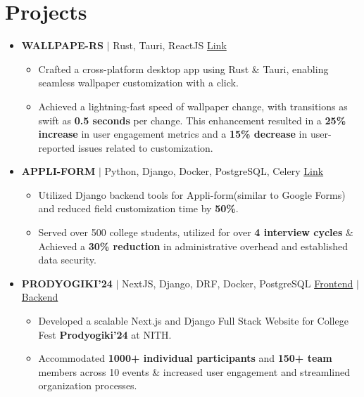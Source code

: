 \documentclass[legalpaper,10.5pt]{article}
\begin{document}
\section{Projects}
\begin{itemize}[leftmargin=*]
\item \textbf{WALLPAPE-RS} $|$ Rust, Tauri, ReactJS  \hfill \href{https://github.com/swastkk/wallpape-rs}{Link}
{\small
\begin{itemize}[label=$\diamond$,itemsep=0pt]
    \item Crafted a cross-platform desktop app using Rust \& Tauri, enabling seamless wallpaper customization with a click.
    \item Achieved a lightning-fast speed of wallpaper change, with transitions as swift as \textbf{0.5 seconds} per change. This enhancement resulted in a \textbf{25\% increase} in user engagement metrics and a \textbf{15\% decrease} in user-reported issues related to customization.
\end{itemize}
}

\item \textbf{APPLI-FORM} $|$ Python, Django, Docker, PostgreSQL, Celery  \hfill \href{https://github.com/istenith/join.istenith.com}{Link}
{\small
\begin{itemize}[label=$\diamond$]
    \item Utilized Django backend tools for Appli-form(similar to Google Forms) and reduced field customization time by \textbf{50\%}.
    \item Served over 500 college students, utilized for over \textbf{4 interview cycles} \& Achieved a \textbf{30\% reduction} in administrative overhead and established data security.
\end{itemize}
}

\item \textbf{PRODYOGIKI'24} $|$ NextJS, Django, DRF, Docker, PostgreSQL \hfill \href{https://github.com/istenith/prody-frontend}{Frontend} $|$ \href{https://github.com/istenith/prody-backend}{Backend}
{\small
\begin{itemize}[label=$\diamond$]
    \item Developed a scalable Next.js and Django Full Stack Website for College Fest \textbf{Prodyogiki'24} at NITH.
    \item Accommodated \textbf{1000+ individual participants} and \textbf{150+ team} members across 10 events \& increased user engagement and streamlined organization processes.
\end{itemize}
}
\end{itemize}
\end{document}
